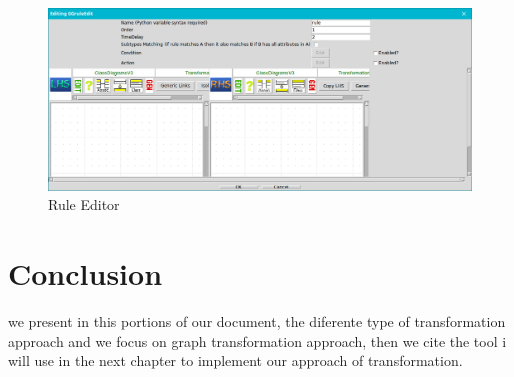 \begin{figure}[th]
	\centering
 	\includegraphics[scale=0.38]{ch3/img/ruleEditor}
	\caption{\label{fig:Rule Editor}Rule Editor}
\end{figure} 

\section{Conclusion}
we present in this portions of our document, the diferente type of transformation approach 
and we focus on graph transformation approach, then we cite the tool i will use in the next chapter to implement 
our approach of transformation.

 